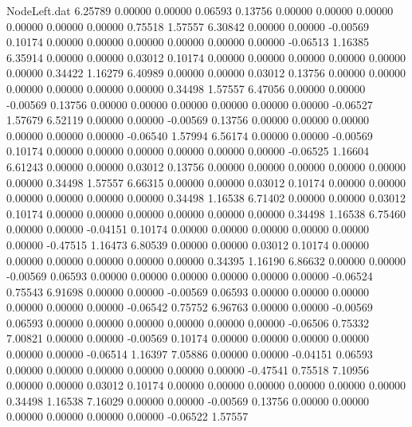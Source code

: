 \begin{filecontents}{NodeLeft.dat}
   6.25789    0.00000    0.00000     0.06593    0.13756    0.00000    0.00000    0.00000    0.00000    0.00000    0.00000    0.75518    1.57557
   6.30842    0.00000    0.00000    -0.00569    0.10174    0.00000    0.00000    0.00000    0.00000    0.00000    0.00000   -0.06513    1.16385
   6.35914    0.00000    0.00000     0.03012    0.10174    0.00000    0.00000    0.00000    0.00000    0.00000    0.00000    0.34422    1.16279
   6.40989    0.00000    0.00000     0.03012    0.13756    0.00000    0.00000    0.00000    0.00000    0.00000    0.00000    0.34498    1.57557
   6.47056    0.00000    0.00000    -0.00569    0.13756    0.00000    0.00000    0.00000    0.00000    0.00000    0.00000   -0.06527    1.57679
   6.52119    0.00000    0.00000    -0.00569    0.13756    0.00000    0.00000    0.00000    0.00000    0.00000    0.00000   -0.06540    1.57994
   6.56174    0.00000    0.00000    -0.00569    0.10174    0.00000    0.00000    0.00000    0.00000    0.00000    0.00000   -0.06525    1.16604
   6.61243    0.00000    0.00000     0.03012    0.13756    0.00000    0.00000    0.00000    0.00000    0.00000    0.00000    0.34498    1.57557
   6.66315    0.00000    0.00000     0.03012    0.10174    0.00000    0.00000    0.00000    0.00000    0.00000    0.00000    0.34498    1.16538
   6.71402    0.00000    0.00000     0.03012    0.10174    0.00000    0.00000    0.00000    0.00000    0.00000    0.00000    0.34498    1.16538
   6.75460    0.00000    0.00000    -0.04151    0.10174    0.00000    0.00000    0.00000    0.00000    0.00000    0.00000   -0.47515    1.16473
   6.80539    0.00000    0.00000     0.03012    0.10174    0.00000    0.00000    0.00000    0.00000    0.00000    0.00000    0.34395    1.16190
   6.86632    0.00000    0.00000    -0.00569    0.06593    0.00000    0.00000    0.00000    0.00000    0.00000    0.00000   -0.06524    0.75543
   6.91698    0.00000    0.00000    -0.00569    0.06593    0.00000    0.00000    0.00000    0.00000    0.00000    0.00000   -0.06542    0.75752
   6.96763    0.00000    0.00000    -0.00569    0.06593    0.00000    0.00000    0.00000    0.00000    0.00000    0.00000   -0.06506    0.75332
   7.00821    0.00000    0.00000    -0.00569    0.10174    0.00000    0.00000    0.00000    0.00000    0.00000    0.00000   -0.06514    1.16397
   7.05886    0.00000    0.00000    -0.04151    0.06593    0.00000    0.00000    0.00000    0.00000    0.00000    0.00000   -0.47541    0.75518
   7.10956    0.00000    0.00000     0.03012    0.10174    0.00000    0.00000    0.00000    0.00000    0.00000    0.00000    0.34498    1.16538
   7.16029    0.00000    0.00000    -0.00569    0.13756    0.00000    0.00000    0.00000    0.00000    0.00000    0.00000   -0.06522    1.57557

\end{filecontents}
